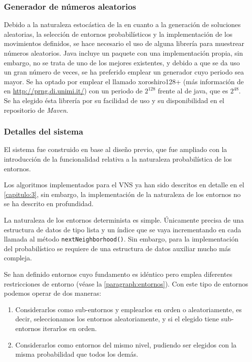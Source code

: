\subsubsection{Generador de números aleatorios}
\label{sec:4:impl:random}

Debido a la naturaleza estocástica de la \fasedos{} en cuanto a la generación de soluciones aleatorias, la selección de entornos probabilísticos y la implementación de los movimientos definidos, se hace necesario el uso de alguna librería para muestrear números aleatorios. Java incluye un paquete con una implementación propia, sin embargo, no se trata de uno de los mejores existentes, y debido a que se da uso un gran número de veces, se ha preferido emplear un generador cuyo periodo sea mayor. Se ha optado por emplear el llamado xoroshiro128+ (más información de en \url{http://prng.di.unimi.it/}) con un periodo de $2^{128}$ frente al de java, que es $2^{48}$. Se ha elegido ésta librería por su facilidad de uso y su disponibilidad en el repositorio de \textit{Maven}.

\subsubsection{Detalles del sistema}
\label{sec:4:detalles-sistema}

El sistema fue construido en base al diseño previo, que fue ampliado con la introducción de la funcionalidad relativa a la naturaleza probabilística de los entornos.

Los algoritmos implementados para el VNS ya han sido descritos en detalle en el \autoref{capitulo:3}, sin embargo, la implementación de la naturaleza de los entornos no se ha descrito en profundidad.

La naturaleza de los entornos determinista es simple. Únicamente precisa de una estructura de datos de tipo lista y un índice que se vaya incrementando en cada llamada al método \texttt{nextNeighborhood()}. Sin embargo, para la implementación del probabilístico se requiere de una estructura de datos auxiliar mucho más compleja.

Se han definido entornos cuyo fundamento es idéntico pero emplea diferentes restricciones de entorno (véase la \autoref{paragraph:entornos}). Con este tipo de entornos podemos operar de dos maneras: 
\begin{enumerate}[label={(\Alph*)}]
	\item Considerarlos como sub-entornos y emplearlos en orden o aleatoriamente, es decir, seleccionamos los entornos aleatoriamente, y si el elegido tiene sub-entornos iterarlos en orden.
	\item \label{modelo-no-ordenado} Considerarlos como entornos del mismo nivel, pudiendo ser elegidos con la misma probabilidad que todos los demás.
\end{enumerate}


